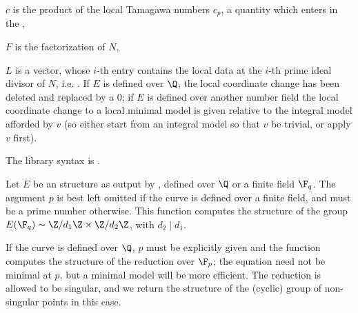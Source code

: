 \item $c$ is the product of the local Tamagawa numbers $c_p$, a quantity
which enters in the ,

\item $F$ is the factorization of $N$,

\item $L$ is a vector, whose $i$-th entry contains the local data
at the $i$-th prime ideal divisor of $N$, i.e.
. If $E$ is defined over $\Q$, the local
coordinate change has been deleted and replaced by a 0; if $E$ is defined
over another number field the local coordinate change to a local minimal
model is given relative to the integral model afforded by $v$ (so either
start from an integral model so that $v$ be trivial, or apply $v$ first).

The library syntax is .

\label{se:ellgroup}
Let $E$ be an  structure as output by , defined over
$\Q$ or a finite field $\F_q$. The argument $p$ is best left omitted if the
curve is defined over a finite field, and must be a prime number otherwise.
This function computes the structure of the group $E(\F_q) \sim \Z/d_1\Z
\times \Z/d_2\Z$, with $d_2\mid d_1$.

If the curve is defined over $\Q$, $p$ must be explicitly given and the
function computes the structure of the reduction over $\F_p$; the
equation need not be minimal at $p$, but a minimal model will be more
efficient. The reduction is allowed to be singular, and we return the
structure of the (cyclic) group of non-singular points in this case.

